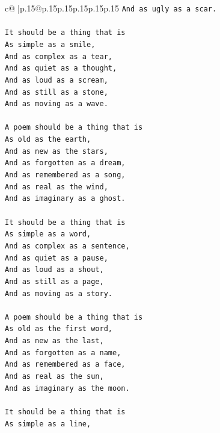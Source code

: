\documentclass{article}
\begin{document}
{\begin{supertabular}{c@{$\;$}|p{.15\linewidth}@{}p{.15\linewidth}p{.15\linewidth}p{.15\linewidth}p{.15\linewidth}p{.15\linewidth}}
{{{\texttt{And as ugly as a scar.} \\
\\ 
\texttt{It should be a thing that is} \\
\texttt{As simple as a smile,} \\
\texttt{And as complex as a tear,} \\
\texttt{And as quiet as a thought,} \\
\texttt{And as loud as a scream,} \\
\texttt{And as still as a stone,} \\
\texttt{And as moving as a wave.} \\
\\ 
\texttt{A poem should be a thing that is} \\
\texttt{As old as the earth,} \\
\texttt{And as new as the stars,} \\
\texttt{And as forgotten as a dream,} \\
\texttt{And as remembered as a song,} \\
\texttt{And as real as the wind,} \\
\texttt{And as imaginary as a ghost.} \\
\\ 
\texttt{It should be a thing that is} \\
\texttt{As simple as a word,} \\
\texttt{And as complex as a sentence,} \\
\texttt{And as quiet as a pause,} \\
\texttt{And as loud as a shout,} \\
\texttt{And as still as a page,} \\
\texttt{And as moving as a story.} \\
\\ 
\texttt{A poem should be a thing that is} \\
\texttt{As old as the first word,} \\
\texttt{And as new as the last,} \\
\texttt{And as forgotten as a name,} \\
\texttt{And as remembered as a face,} \\
\texttt{And as real as the sun,} \\
\texttt{And as imaginary as the moon.} \\
\\ 
\texttt{It should be a thing that is} \\
\texttt{As simple as a line,} \\
}}}
\end{supertabular}}
\end{document}
